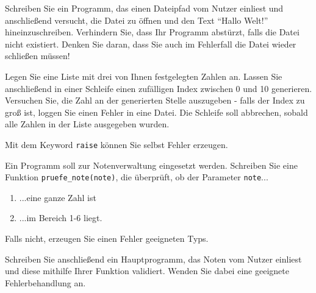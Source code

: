 \documentclass[11pt, a4paper, oneside]{article}
\begin{document}
	\pagebreak
	
	Schreiben Sie ein Programm, das einen Dateipfad vom Nutzer einliest und anschließend versucht, die Datei zu öffnen und den Text ``Hallo Welt!'' hineinzuschreiben.
	Verhindern Sie, dass Ihr Programm abstürzt, falls die Datei nicht existiert.
	Denken Sie daran, dass Sie auch im Fehlerfall die Datei wieder schließen müssen!
	
	
	Legen Sie eine Liste mit drei von Ihnen festgelegten Zahlen an.
	Lassen Sie anschließend in einer Schleife einen zufälligen Index zwischen 0 und 10 generieren.
	Versuchen Sie, die Zahl an der generierten Stelle auszugeben - falls der Index zu groß ist, loggen Sie einen Fehler in eine Datei.
	Die Schleife soll abbrechen, sobald alle Zahlen in der Liste ausgegeben wurden.
	
	
	Mit dem Keyword \texttt{raise} können Sie selbst Fehler erzeugen.
	
	Ein Programm soll zur Notenverwaltung eingesetzt werden.
	Schreiben Sie eine Funktion \texttt{pruefe\_note(note)}, die überprüft, ob der Parameter \texttt{note}...
	\begin{enumerate}[label=(\alph*)]
		\item ...eine ganze Zahl ist
		\item ...im Bereich 1-6 liegt.
	\end{enumerate}
	Falls nicht, erzeugen Sie einen Fehler geeigneten Typs.
	
	Schreiben Sie anschließend ein Hauptprogramm, das Noten vom Nutzer einliest und diese mithilfe Ihrer Funktion validiert.
	Wenden Sie dabei eine geeignete Fehlerbehandlung an.
\end{document}
